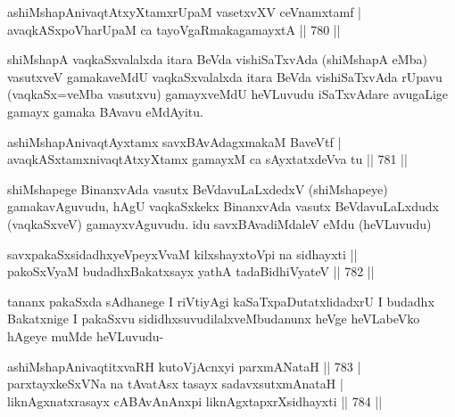 \begin{shl}
ashiMshapAnivaqtAtxyXtamxrUpaM vasetxvXV ceVnamxtamf | \\
avaqkASxpoVharUpaM ca tayoVgaRmakagamayxtA \hfill||  780 ||  
\end{shl}

\begin{artha}
shiMshapA vaqkaSxvalalxda itara BeVda vishiSaTxvAda (shiMshapA eMba) vasutxveV gamakaveMdU vaqkaSxvalalxda itara BeVda vishiSaTxvAda rUpavu (vaqkaSx=veMba vasutxvu) gamayxveMdU heVLuvudu iSaTxvAdare avugaLige gamayx gamaka BAvavu eMdAyitu.
\end{artha}


\begin{shl}
ashiMshapAnivaqtAyxtamx savxBAvAdagxmakaM BaveVtf | \\
avaqkASxtamxnivaqtAtxyXtamx gamayxM ca sAyxtatxdeVva tu \hfill||  781 ||  
\end{shl}

\begin{artha}
shiMshapege BinanxvAda vasutx BeVdavuLaLxdedxV (shiMshapeye) gamakavAguvudu, hAgU vaqkaSxkekx BinanxvAda vasutx BeVdavuLaLxdudx (vaqkaSxveV) gamayxvAguvudu. idu savxBAvadiMdaleV eMdu (heVLuvudu)
\end{artha}


\begin{shl}
savxpakaSxsidadhxyeV\s peyxVvaM kilxshayxtoV\s pi na sidhayxti ||  \\
pakoSxV\s yaM budadhxBakatxsayx yathA tadaBidhiVyateV \hfill||  782 ||  
\end{shl}

\begin{artha}
tananx pakaSxda sAdhanege I riVtiyAgi kaSaTxpaDutatxlidadxrU I budadhx Bakatxnige I pakaSxvu sididhxsuvudilalxveMbudanunx heVge heVLabeVko hAgeye muMde heVLuvudu-
\end{artha}


\begin{shl}
ashiMshapAnivaqtitxvaRH kutoV\s jAcnxyi parxmANataH \hfill||  783 | \\
parxtayxkeSxVNa na tAvatAsx tasayx sadavxsutxmAnataH | \\
liknAgxnatxrasayx cABAvAnAnxpi liknAgxtapxrXsidhayxti \hfill||  784 ||  
\end{shl}

